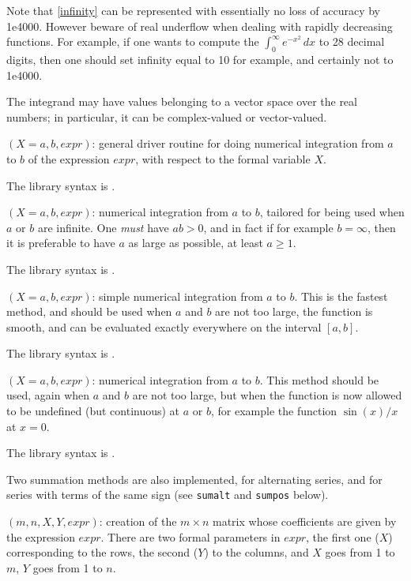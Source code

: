 Note that \ref{infinity} can be represented with essentially no loss of 
accuracy by 1e4000. However beware of real underflow when dealing with rapidly
decreasing functions. For example, if one wants to compute the
$\int_0^\infty e^{-x^2}\,dx$ to 28 decimal digits, then one should set 
infinity equal to 10 for example, and certainly not to 1e4000.

The integrand may have values belonging to a vector space over the real
numbers; in particular, it can be complex-valued or vector-valued.

$(X=a, b, expr)$: general driver routine for doing 
numerical integration from $a$ to $b$ of the expression $expr$, with respect to
the formal variable $X$.

The library syntax is .

$(X=a, b, expr)$: numerical integration from $a$ to $b$,
tailored for being used when $a$ or $b$ are infinite. One {\sl must} have 
$ab>0$, and in fact if for example $b=\infty$, then it is preferable to have 
$a$ as large as possible, at least $a\ge1$.

The library syntax is .

$(X=a,b,expr)$: simple numerical integration from $a$ to $b$.
This is the fastest method, and should be used when $a$ and $b$ are not too
large, the function is smooth, and can be evaluated exactly everywhere on the
interval $[a,b]$.

The library syntax is .

$(X=a,b,expr)$: numerical integration from $a$ to $b$. This
method should be used, again when $a$ and $b$ are not too large, but when the 
function is now allowed to be undefined (but continuous) at $a$ or $b$, for
example the function $\sin(x)/x$ at $x=0$.

The library syntax is .

Two summation methods are also implemented, for alternating series, and for
series with terms of the same sign (see {\tt sumalt} and {\tt sumpos} below).

$(m,n,X,Y,expr)$: creation of the $m\times n$ matrix
whose coefficients are given by the expression $expr$. There are two formal
parameters in $expr$, the first one ($X$) corresponding to the rows, the
second ($Y$) to the columns, and $X$ goes from 1 to $m$, $Y$ goes from 1 to
$n$.

